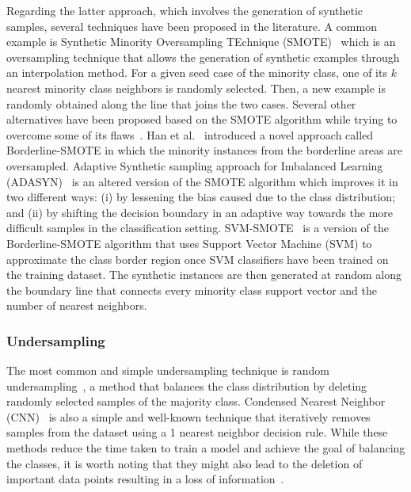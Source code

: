 \documentclass{article}
\begin{document}
Regarding the latter approach, which involves the generation of synthetic samples, several techniques have been proposed in the literature. A common example is Synthetic Minority Oversampling TEchnique (SMOTE)~\cite{chawlaSMOTESyntheticMinority2002} which is an oversampling technique that allows the generation of synthetic examples through an interpolation method. For a given seed case of the minority class, one of its $k$ nearest minority class neighbors is randomly selected. Then, a new example is randomly obtained along the line that joins the two cases. Several other alternatives have been proposed based on the SMOTE algorithm while trying to overcome some of its flaws~\cite{saezSMOTEIPFAddressing2015}. Han et al.~\cite{hanBorderlineSMOTENewSampling2005} introduced a novel approach called Borderline-SMOTE in which the minority instances from the borderline areas are oversampled. Adaptive Synthetic sampling approach for Imbalanced Learning (ADASYN)~\cite{haiboheADASYNAdaptiveSynthetic2008} is an altered version of the SMOTE algorithm which improves it in two different ways: (i) by lessening the bias caused due to the class distribution; and (ii) by shifting the decision boundary in an adaptive way towards the more difficult samples in the classification setting. SVM-SMOTE~\cite{nguyenBorderlineSamplingImbalanced2011} is a version of the Borderline-SMOTE algorithm that uses Support Vector Machine (SVM) to approximate the class border region once SVM classifiers have been trained on the training dataset. The synthetic instances are then generated at random along the boundary line that connects every minority class support vector and the number of nearest neighbors.

\subsubsection{Undersampling}
The most common and simple undersampling technique is random undersampling~\cite{kubatAddressingCurseImbalanced2000}, a method that balances the class distribution by deleting randomly selected samples of the majority class. Condensed Nearest Neighbor (CNN)~\cite{hartCondensedNearestNeighbor1968} is also a simple and well-known technique that iteratively removes samples from the dataset using a 1 nearest neighbor decision rule. While these methods reduce the time taken to train a model and achieve the goal of balancing the classes, it is worth noting that they might also lead to the deletion of important data points resulting in a loss of information~\cite{seiffertRUSBoostImprovingClassification2008}. 
\end{document}
